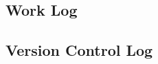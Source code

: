 \documentclass[journal, letterpaper, draftclsnofoot, onecolumn, 10pt]{IEEEtran}
\begin{document}
%
%
%
%
%

\subsection{Work Log}


\clearpage
\subsection{Version Control Log}
\end{document}
